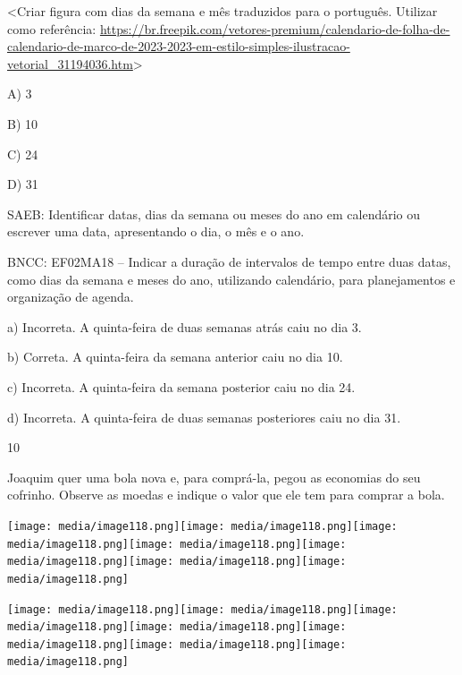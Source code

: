 \begin{escolha}
\begin{escolha}
{{{{\textless{}Criar figura com dias da semana e mês traduzidos para o
português. Utilizar como referência:
\url{https://br.freepik.com/vetores-premium/calendario-de-folha-de-calendario-de-marco-de-2023-2023-em-estilo-simples-ilustracao-vetorial_31194036.htm}\textgreater{}

A) 3

B) 10

C) 24

D) 31

SAEB: Identificar datas, dias da semana ou meses do ano em
calendário ou escrever uma data, apresentando o dia, o mês e o ano.

BNCC: EF02MA18 -- Indicar a duração de intervalos de tempo entre duas
datas, como dias da semana e meses do ano, utilizando calendário, para
planejamentos e organização de agenda.

a) Incorreta. A quinta-feira de duas semanas atrás caiu no dia 3.

b) Correta. A quinta-feira da semana anterior caiu no dia 10.

c) Incorreta. A quinta-feira da semana posterior caiu no dia 24.

d) Incorreta. A quinta-feira de duas semanas posteriores caiu no dia 31.

\num{10}

Joaquim quer uma bola nova e, para comprá-la, pegou as economias do
seu cofrinho. Observe as moedas e indique o valor que ele tem para comprar a bola.

\texttt{[image: media/image118.png]}\texttt{[image: media/image118.png]}\texttt{[image: media/image118.png]}\texttt{[image: media/image118.png]}\texttt{[image: media/image118.png]}\texttt{[image: media/image118.png]}\texttt{[image: media/image118.png]}

\texttt{[image: media/image118.png]}\texttt{[image: media/image118.png]}\texttt{[image: media/image118.png]}\texttt{[image: media/image118.png]}\texttt{[image: media/image118.png]}\texttt{[image: media/image118.png]}\texttt{[image: media/image118.png]}

}}}}
\end{escolha}
\end{escolha}
